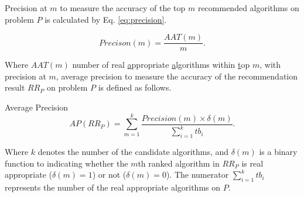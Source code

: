 \documentclass[prodmode,acmtkdd]{acmsmall}
\begin{document}
Precision at $m$ to measure the accuracy of the top $m$ recommended
algorithms on problem $P$ is calculated by Eq. \ref{eq:precision}.

\begin{equation}\label{eq:precision}
        Precison(m) = \frac{AAT(m)}{m}.
\end{equation}

Where $AAT(m)$ number of real \underline{a}ppropriate
\underline{a}lgorithms within \underline{t}op $m$, with precision at
$m$, average precision \cite{baeza1999modern} to measure the
accuracy of the recommendation result $RR_{P}$ on problem $P$ is
defined as follows.

\begin{definition} Average Precision \label{def:averPrecsion}
    \begin{equation}
        AP(RR_{P}) = \sum_{m = 1}^{k}\frac{Precision(m)\times
        \delta(m)}{\sum_{i=1}^{k}tb_i}.
    \end{equation}
\end{definition}

Where $k$ denotes the number of the candidate algorithms, and
$\delta(m)$ is a binary function to indicating whether the $m$th
ranked algorithm in $RR_{P}$ is real appropriate ($\delta(m) = 1$)
or not ($\delta(m) = 0$). The numerator $\sum_{i=1}^{k}tb_i$
represents the number of the real appropriate algorithms on $P$.
\end{document}
